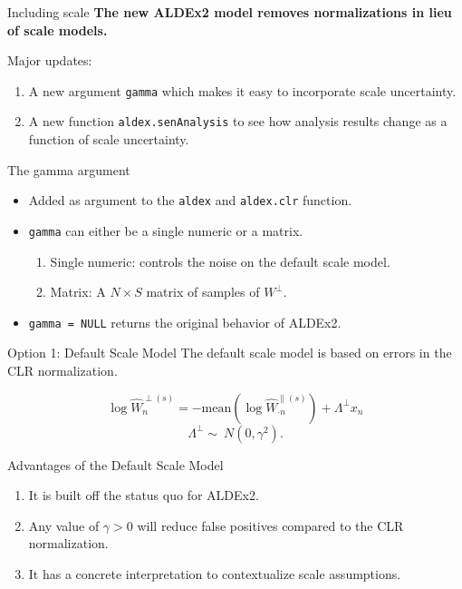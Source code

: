 \documentclass[
  ignorenonframetext,
]{beamer}
\providecommand{\tightlist}{%
  \setlength{\itemsep}{0pt}\setlength{\parskip}{0pt}}
\begin{document}
\begin{frame}[fragile]{Including scale}
\protect\hypertarget{including-scale-1}{}
\textbf{The new ALDEx2 model removes normalizations in lieu of scale
models.}

\vspace{.25in}

Major updates:

\begin{enumerate}
\item
  A new argument \texttt{gamma} which makes it easy to incorporate scale
  uncertainty.
\item
  A new function \texttt{aldex.senAnalysis} to see how analysis results
  change as a function of scale uncertainty.
\end{enumerate}
\end{frame}

\begin{frame}[fragile]{The gamma argument}
\protect\hypertarget{the-gamma-argument}{}
\begin{itemize}
\item
  Added as argument to the \texttt{aldex} and \texttt{aldex.clr}
  function.
\item
  \texttt{gamma} can either be a single numeric or a matrix.

  \begin{enumerate}
  \tightlist
  \item
    Single numeric: controls the noise on the default scale model.
  \item
    Matrix: A \(N \times S\) matrix of samples of \(W^\perp\).
  \end{enumerate}
\item
  \texttt{gamma\ =\ NULL} returns the original behavior of ALDEx2.
\end{itemize}
\end{frame}

\begin{frame}{Option 1: Default Scale Model}
\protect\hypertarget{option-1-default-scale-model}{}
The default scale model is based on errors in the CLR normalization.

\[\log \hat{W}_{n}^{\perp(s)} = - \mathrm{mean} \left(\log \hat{W}^{\parallel (s)}_{\cdot n}\right) + \Lambda^\perp x_{n}\]
\[\Lambda^\perp  \sim \ N(0, \gamma^2).\]
\end{frame}

\begin{frame}{Advantages of the Default Scale Model}
\protect\hypertarget{advantages-of-the-default-scale-model}{}
\begin{enumerate}
\item
  It is built off the status quo for ALDEx2.
\item
  Any value of \(\gamma > 0\) will reduce false positives compared to
  the CLR normalization.
\item
  It has a concrete interpretation to contextualize scale assumptions.
\end{enumerate}
\end{frame}
\end{document}
